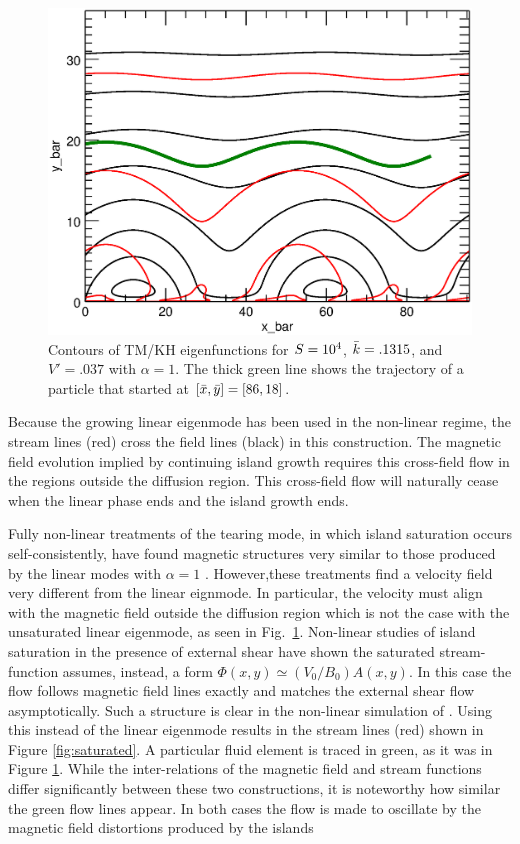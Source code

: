 	\begin{figure}[htbp]
		\centerline{\includegraphics[scale=.8]{ParkerLongcope2017/contour_saturated.eps}}
		\caption{Contours of TM/KH eigenfunctions for $S=10^4$, $\bar{k}=.1315$, and $V' = .037$  with $\alpha = 1$. The thick green line shows the trajectory of a particle that started at $[\bar{x},\bar{y}]=[86,18]$. }
		\label{fig:contour_sat}
	\end{figure}

	
Because the growing linear eigenmode has been used in the non-linear regime, the stream lines (red) cross the field lines (black) in this construction.  The magnetic field evolution implied by continuing island growth requires this cross-field flow in the regions outside the diffusion region.   This cross-field flow will naturally cease when the linear phase ends and the island growth ends.
	
Fully non-linear treatments of the tearing mode, in which island saturation occurs self-consistently, have found magnetic structures very similar to those produced by the linear modes with $\alpha=1$ \citep{Offman1993,Chen1997,Li2010,Zhang2011,Doss2015}.  However,these treatments find a velocity field very different from the linear eignmode.  In particular, the velocity must align with the magnetic field outside the diffusion region which is not the case with the unsaturated linear eigenmode, as seen in Fig.\ \ref{fig:contour_sat}.   Non-linear studies of island saturation in the presence of external shear have shown the saturated stream-function assumes, instead, a form $\Phi(x,y) \simeq (V_0/ B_0)A(x,y)$.  In this case the flow follows magnetic field lines exactly and matches the  external shear flow asymptotically.  Such a structure is clear in the non-linear simulation of \citet{Offman1993}. Using this instead of the linear eigenmode results in the stream lines (red) shown in Figure \ref{fig:saturated}.  A particular fluid element is traced in green, as it was in Figure \ref{fig:contour_sat}.  While the inter-relations of the magnetic field and stream functions differ significantly between these two constructions, it is noteworthy how similar the green flow lines appear.  In both cases the flow is made to oscillate by the magnetic field distortions produced by the islands 

